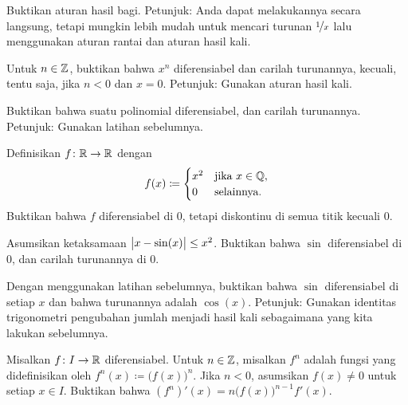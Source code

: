 \begin{exercise}
Buktikan aturan hasil bagi.  Petunjuk: Anda dapat melakukannya secara langsung, tetapi mungkin
lebih mudah untuk mencari turunan $\nicefrac{1}{x}$ lalu menggunakan
aturan rantai dan aturan hasil kali.
\end{exercise}

\begin{exercise} \label{exercise:diffofxn}
Untuk $n \in {\mathbb{Z}}$,
buktikan bahwa $x^n$ diferensiabel dan carilah turunannya,
kecuali, tentu saja, jika $n < 0$ dan $x=0$.
Petunjuk: Gunakan aturan hasil kali.
\end{exercise}

\begin{exercise}
Buktikan bahwa suatu polinomial diferensiabel, dan carilah turunannya.
Petunjuk: Gunakan latihan sebelumnya.
\end{exercise}

\begin{exercise}
Definisikan $f \colon {\mathbb{R}} \to {\mathbb{R}}$ dengan
\begin{equation*}
f(x) \coloneqq
\begin{cases}
x^2 & \text{jika } x \in {\mathbb{Q}},\\
0 & \text{selainnya.}
\end{cases}
\end{equation*}
Buktikan bahwa $f$ diferensiabel di $0$, tetapi diskontinu di semua titik
kecuali $0$.
\end{exercise}

\begin{exercise}
Asumsikan ketaksamaan $\bigl\lvert {x-\sin(x)} \bigr\rvert \leq x^2$.  Buktikan bahwa $\sin$
diferensiabel di $0$, dan carilah turunannya di $0$.
\end{exercise}

\begin{exercise}
Dengan menggunakan latihan sebelumnya, buktikan bahwa $\sin$ diferensiabel di setiap $x$
dan bahwa turunannya adalah $\cos(x)$.  Petunjuk: Gunakan identitas trigonometri
pengubahan jumlah menjadi hasil kali sebagaimana yang kita lakukan sebelumnya.
\end{exercise}

\begin{exercise}
Misalkan $f \colon I \to {\mathbb{R}}$ diferensiabel.  Untuk $n \in {\mathbb{Z}}$, misalkan $f^n$
adalah fungsi yang didefinisikan oleh $f^n(x) \coloneqq {\bigl( f(x) \bigr)}^n$.  Jika
$n < 0$, asumsikan $f(x) \neq 0$ untuk setiap $x \in I$.  Buktikan bahwa
$(f^n)'(x) = n {\bigl(f(x) \bigr)}^{n-1} f'(x)$.
\end{exercise}

